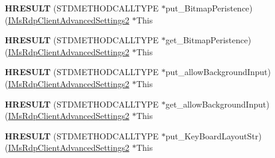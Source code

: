 \begin{DoxyCompactItemize}
\item 
\mbox{\label{struct_m_s_t_s_c_lib_1_1_i_ms_rdp_client_advanced_settings2_vtbl_a2f560cf74395220517443896c40a40bd}} 
{\bfseries H\+R\+E\+S\+U\+LT} (S\+T\+D\+M\+E\+T\+H\+O\+D\+C\+A\+L\+L\+T\+Y\+PE $\ast$put\+\_\+\+Bitmap\+Peristence)(\hyperlink{interface_m_s_t_s_c_lib_1_1_i_ms_rdp_client_advanced_settings2}{I\+Ms\+Rdp\+Client\+Advanced\+Settings2} $\ast$This
\item 
\mbox{\label{struct_m_s_t_s_c_lib_1_1_i_ms_rdp_client_advanced_settings2_vtbl_a572c42dc4cf8210075fc64b3cbcaae3d}} 
{\bfseries H\+R\+E\+S\+U\+LT} (S\+T\+D\+M\+E\+T\+H\+O\+D\+C\+A\+L\+L\+T\+Y\+PE $\ast$get\+\_\+\+Bitmap\+Peristence)(\hyperlink{interface_m_s_t_s_c_lib_1_1_i_ms_rdp_client_advanced_settings2}{I\+Ms\+Rdp\+Client\+Advanced\+Settings2} $\ast$This
\item 
\mbox{\label{struct_m_s_t_s_c_lib_1_1_i_ms_rdp_client_advanced_settings2_vtbl_a99cde15261d3c4297559ccd1e3a083f2}} 
{\bfseries H\+R\+E\+S\+U\+LT} (S\+T\+D\+M\+E\+T\+H\+O\+D\+C\+A\+L\+L\+T\+Y\+PE $\ast$put\+\_\+allow\+Background\+Input)(\hyperlink{interface_m_s_t_s_c_lib_1_1_i_ms_rdp_client_advanced_settings2}{I\+Ms\+Rdp\+Client\+Advanced\+Settings2} $\ast$This
\item 
\mbox{\label{struct_m_s_t_s_c_lib_1_1_i_ms_rdp_client_advanced_settings2_vtbl_a5694562efd91d840f47e29106eee0705}} 
{\bfseries H\+R\+E\+S\+U\+LT} (S\+T\+D\+M\+E\+T\+H\+O\+D\+C\+A\+L\+L\+T\+Y\+PE $\ast$get\+\_\+allow\+Background\+Input)(\hyperlink{interface_m_s_t_s_c_lib_1_1_i_ms_rdp_client_advanced_settings2}{I\+Ms\+Rdp\+Client\+Advanced\+Settings2} $\ast$This
\item 
\mbox{\label{struct_m_s_t_s_c_lib_1_1_i_ms_rdp_client_advanced_settings2_vtbl_a37a1135607d1b9cd51e8be94b3d3c6c4}} 
{\bfseries H\+R\+E\+S\+U\+LT} (S\+T\+D\+M\+E\+T\+H\+O\+D\+C\+A\+L\+L\+T\+Y\+PE $\ast$put\+\_\+\+Key\+Board\+Layout\+Str)(\hyperlink{interface_m_s_t_s_c_lib_1_1_i_ms_rdp_client_advanced_settings2}{I\+Ms\+Rdp\+Client\+Advanced\+Settings2} $\ast$This
\item 

\end{DoxyCompactItemize}
